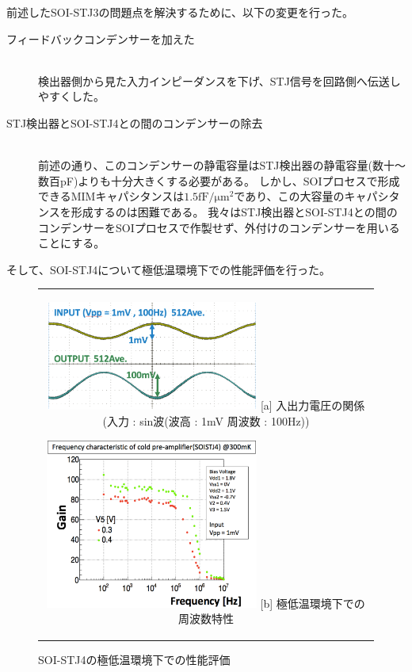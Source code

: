 		前述したSOI-STJ3の問題点を解決するために、以下の変更を行った。
		\begin{description}
			\item[フィードバックコンデンサーを加えた]\mbox{}\\
				検出器側から見た入力インピーダンスを下げ、STJ信号を回路側へ伝送しやすくした。
			\item[STJ検出器とSOI-STJ4との間のコンデンサーの除去]\mbox{}\\
				前述の通り、このコンデンサーの静電容量はSTJ検出器の静電容量(数十〜数百pF)よりも十分大きくする必要がある。
				しかし、SOIプロセスで形成できるMIMキャパシタンスは$1.5 \mathrm{fF/{\mu m}^2}$であり、この大容量のキャパシタンスを形成するのは困難である。
				我々はSTJ検出器とSOI-STJ4との間のコンデンサーをSOIプロセスで作製せず、外付けのコンデンサーを用いることにする。
		\end{description}
		そして、SOI-STJ4について極低温環境下での性能評価を行った。
		\begin{figure}[htbp]
			\begin{center}
				\begin{tabular}{c}
					\begin{minipage}{0.5\hsize}
						\begin{center}
							\includegraphics[clip, width=7.0cm]{./Chapter/Chapter3/Picture/SOISTJ4_InOut_100Hz.eps}
							\hspace{1.6cm} [a] 入出力電圧の関係(入力 : sin波(波高 : 1mV  周波数 : 100Hz))
						\end{center}
					\end{minipage}
					\begin{minipage}{0.5\hsize}
						\begin{center}
							\includegraphics[clip, width=7.0cm]{./Chapter/Chapter3/Picture/SOISTJ4_frequency.eps}
							\hspace{1.6cm} [b] 極低温環境下での周波数特性
						\end{center}
					\end{minipage}
				\end{tabular}
				\caption{SOI-STJ4の極低温環境下での性能評価}
				\label{fig:SOISTJ4_chara}
			\end{center}
		\end{figure}
